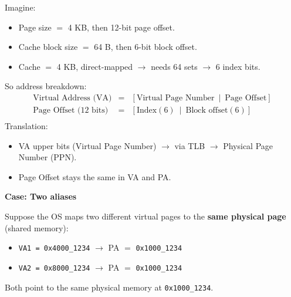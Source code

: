\highspace
\begin{examplebox}
    Imagine:
    \begin{itemize}
        \item Page size $=$ 4 KB, then 12-bit page offset.
        \item Cache block size $=$ 64 B, then 6-bit block offset.
        \item Cache $=$ 4 KB, direct-mapped $\rightarrow$ needs 64 sets $\rightarrow$ 6 index bits.
    \end{itemize}
    So address breakdown:
    \begin{equation*}
        \begin{array}{rcl}
            \text{Virtual Address (VA)} &=& \left[\text{Virtual Page Number} \,\,\, | \,\,\, \text{Page Offset}\right] \\ [.3em]
            \text{Page Offset (12 bits)} &=& \left[\text{Index} (6) \,\,\, | \,\,\, \text{Block offset} (6)\right] \\
        \end{array}
    \end{equation*}
    Translation:
    \begin{itemize}
        \item VA upper bits (Virtual Page Number) $\rightarrow$ via TLB $\rightarrow$ Physical Page Number (PPN).
        \item Page Offset stays the same in VA and PA.
    \end{itemize}

    \begin{flushleft}
        \textcolor{Red2}{ \textbf{Case: Two aliases}}
    \end{flushleft}
    Suppose the OS maps two different virtual pages to the \textbf{same physical page} (shared memory):
    \begin{itemize}
        \item \texttt{VA1 = 0x4000\_1234} $\rightarrow$ PA $=$ \texttt{0x1000\_1234}
        \item \texttt{VA2 = 0x8000\_1234} $\rightarrow$ PA $=$ \texttt{0x1000\_1234}
    \end{itemize}
    Both point to the same physical memory at \texttt{0x1000\_1234}.


\end{examplebox}
